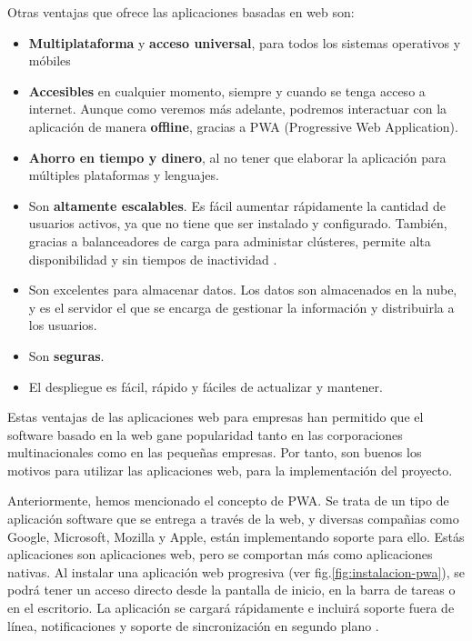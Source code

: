\vspace{5mm}

\noindent Otras ventajas que ofrece las aplicaciones basadas en web son: 

\begin{itemize}
    \item \textbf{Multiplataforma} y \textbf{acceso universal}, para todos los sistemas operativos y móbiles
    \item \textbf{Accesibles} en cualquier momento, siempre y cuando se tenga acceso a internet. Aunque como veremos 
    más adelante, podremos interactuar con la aplicación de manera \textbf{offline}, gracias a PWA (Progressive Web 
    Application).
    \item \textbf{Ahorro en tiempo y dinero}, al no tener que elaborar la aplicación para múltiples plataformas y 
    lenguajes.
    \item Son \textbf{altamente escalables}. Es fácil aumentar rápidamente la cantidad de usuarios activos, ya que 
    no tiene que ser instalado y configurado. También, gracias a balanceadores de carga para administar clústeres,
    permite alta disponibilidad y sin tiempos de inactividad \cite{swap}. 
    \item Son excelentes para almacenar datos. Los datos son almacenados en la nube, y es el servidor el que se 
    encarga de gestionar la información y distribuirla a los usuarios.
    \item Son \textbf{seguras}.
    \item El despliegue es fácil, rápido y fáciles de actualizar y mantener.
\end{itemize}

\noindent Estas ventajas de las aplicaciones web para empresas han permitido que el software basado en la web gane 
popularidad tanto en las corporaciones multinacionales como en las pequeñas empresas. Por tanto, son buenos los 
motivos para utilizar las aplicaciones web, para la implementación del proyecto.

\vspace{5mm}

\noindent Anteriormente, hemos mencionado el concepto de PWA. Se trata de un tipo de aplicación software que se entrega
a través de la web, y diversas compañias como Google, Microsoft, Mozilla y Apple, están implementando soporte para ello. 
Estás aplicaciones son aplicaciones web, pero se comportan más como aplicaciones nativas. Al instalar una aplicación 
web progresiva (ver fig.\ref{fig:instalacion-pwa}), se podrá tener un acceso directo desde la pantalla de inicio, en la 
barra de tareas o en el escritorio. La aplicación se cargará rápidamente e incluirá soporte fuera de línea, 
notificaciones y soporte de sincronización en segundo plano \cite{progressive-web-apps}. 

